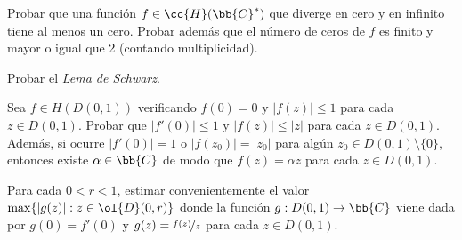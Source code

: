\documentclass[12pt]{article}
\begin{document}
    \begin{ejercicio}[2.5 puntos]
        Probar que una función $f \in \cc{H}(\bb{C}^*)$ que diverge en cero y en infinito tiene al menos un cero. Probar además que el número de ceros de $f$ es finito y mayor o igual que 2 (contando multiplicidad).
    \end{ejercicio}

    \begin{ejercicio}[2.5 puntos]
        Probar el \emph{Lema de Schwarz}.
        \begin{lema*}[de Schwarz]
            Sea $f \in H(D(0, 1))$ verificando $f(0) = 0$ y $|f(z)| \leq 1$ para cada $z \in D(0, 1)$. Probar que $|f'(0)| \leq 1$ y $|f(z)| \leq |z|$ para cada $z \in D(0, 1)$. Además, si ocurre $|f'(0)| = 1$ o $|f(z_0)| = |z_0|$ para algún $z_0 \in D(0, 1) \setminus \{0\}$, entonces existe $\alpha \in \bb{C}$ de modo que $f(z) = \alpha z$ para cada $z \in D(0, 1)$.
        \end{lema*}
        \begin{observacion}
            Para cada $0 < r < 1$, estimar convenientemente el valor $\max\{ |g(z)| : z \in \ol{D}(0, r) \}$ donde la función $g : D(0, 1) \to \bb{C}$ viene dada por $g(0) = f'(0)$ y $g(z) = \nicefrac{f(z)}{z}$ para cada $z \in D(0, 1)$.
        \end{observacion}
    \end{ejercicio}


    \newpage
    \setcounter{ejercicio}{0}
    
\end{document}
